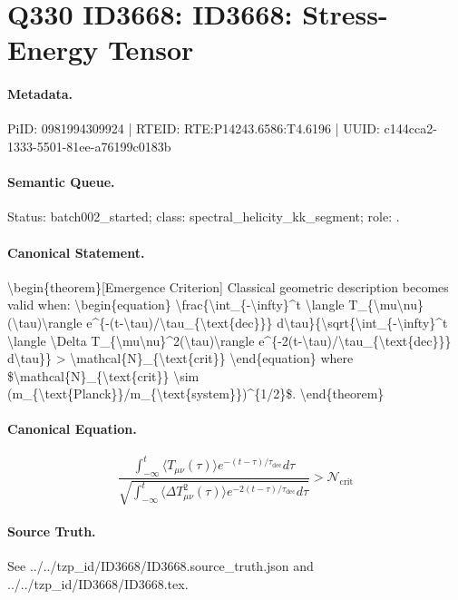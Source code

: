 \section*{Q330 ID3668: ID3668: Stress-Energy Tensor}
\paragraph{Metadata.}
PiID: 0981994309924 | RTEID: RTE:P14243.6586:T4.6196 | UUID: c144cca2-1333-5501-81ee-a76199c0183b

\paragraph{Semantic Queue.}
Status: batch002\_started; class: spectral\_helicity\_kk\_segment; role: .

\paragraph{Canonical Statement.}
\textbackslash{}begin\{theorem\}[Emergence Criterion] Classical geometric description becomes valid when: \textbackslash{}begin\{equation\} \textbackslash{}frac\{\textbackslash{}int\_\{-\textbackslash{}infty\}\textasciicircum{}t \textbackslash{}langle T\_\{\textbackslash{}mu\textbackslash{}nu\}(\textbackslash{}tau)\textbackslash{}rangle e\textasciicircum{}\{-(t-\textbackslash{}tau)/\textbackslash{}tau\_\{\textbackslash{}text\{dec\}\}\} d\textbackslash{}tau\}\{\textbackslash{}sqrt\{\textbackslash{}int\_\{-\textbackslash{}infty\}\textasciicircum{}t \textbackslash{}langle \textbackslash{}Delta T\_\{\textbackslash{}mu\textbackslash{}nu\}\textasciicircum{}2(\textbackslash{}tau)\textbackslash{}rangle e\textasciicircum{}\{-2(t-\textbackslash{}tau)/\textbackslash{}tau\_\{\textbackslash{}text\{dec\}\}\} d\textbackslash{}tau\}\} > \textbackslash{}mathcal\{N\}\_\{\textbackslash{}text\{crit\}\} \textbackslash{}end\{equation\} where \$\textbackslash{}mathcal\{N\}\_\{\textbackslash{}text\{crit\}\} \textbackslash{}sim (m\_\{\textbackslash{}text\{Planck\}\}/m\_\{\textbackslash{}text\{system\}\})\textasciicircum{}\{1/2\}\$. \textbackslash{}end\{theorem\}

\paragraph{Canonical Equation.}
\[
\begin{equation} \frac{\int_{-\infty}^t \langle T_{\mu\nu}(\tau)\rangle e^{-(t-\tau)/\tau_{\text{dec}}} d\tau}{\sqrt{\int_{-\infty}^t \langle \Delta T_{\mu\nu}^2(\tau)\rangle e^{-2(t-\tau)/\tau_{\text{dec}}} d\tau}} > \mathcal{N}_{\text{crit}} \end{equation}
\]

\paragraph{Source Truth.}
See ../../tzp\_id/ID3668/ID3668.source\_truth.json and ../../tzp\_id/ID3668/ID3668.tex.
